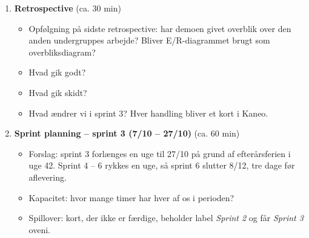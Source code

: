 \documentclass[a4paper,11pt]{article}
\begin{document}
\begin{enumerate}
    \begin{figure}[H]
        \centering
        \velocitytable
        \caption{Velocity pr. sprint. Afstanden mellem committed og done er faldet fra 23 point i sprint 1 til 3 point i sprint 2: vi tog mindre ind og blev færdige med næsten det hele.}
        \label{fig:velocity}
    \end{figure}
    \item \textbf{Retrospective} (ca. 30 min)
    \begin{itemize}
        \item Opfølgning på sidste retrospective: har demoen givet overblik over den anden undergruppes arbejde? Bliver E/R-diagrammet brugt som overbliksdiagram?
        \item Hvad gik godt?
        \item Hvad gik skidt?
        \item Hvad ændrer vi i sprint 3? Hver handling bliver et kort i Kaneo.
    \end{itemize}
    \item \textbf{Sprint planning -- sprint 3 (7/10 -- 27/10)} (ca. 60 min)
    \begin{itemize}
        \item Forslag: sprint 3 forlænges en uge til 27/10 på grund af efterårsferien i uge 42. Sprint 4 -- 6 rykkes en uge, så sprint 6 slutter 8/12, tre dage før aflevering.
        \item Kapacitet: hvor mange timer har hver af os i perioden?
        \item Spillover: kort, der ikke er færdige, beholder label \emph{Sprint 2} og får \emph{Sprint 3} oveni.

\end{itemize}
\end{enumerate}
\end{document}

